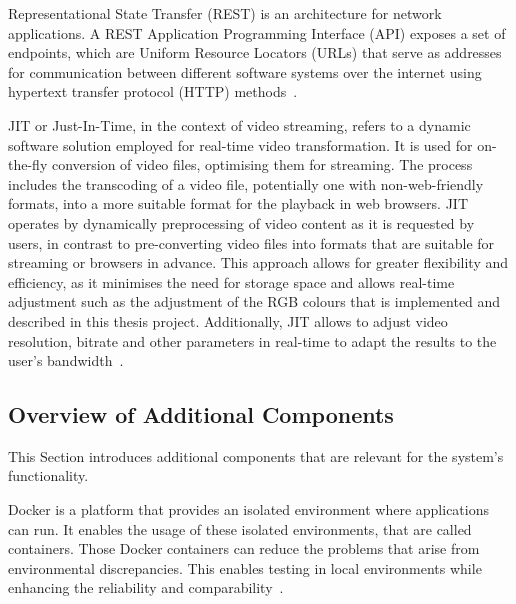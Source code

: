 \documentclass[../MasterThesis.tex]{subfiles}
\begin{document}


Representational State Transfer (REST) is an architecture for network applications. A REST Application Programming Interface (API) exposes a set of endpoints, which are Uniform Resource Locators (URLs) that serve as addresses for communication between different software systems over the internet using hypertext transfer protocol (HTTP) methods~\cite{IEEE_Rest, webservice, Nodejs_Rest}.



	
JIT or Just-In-Time, in the context of video streaming, refers to a dynamic software solution employed for real-time video transformation. 
It is used for on-the-fly conversion of video files, optimising them for streaming. The process includes the transcoding of a video file, potentially one with non-web-friendly formats, into a more suitable format for the playback in web browsers.
JIT operates by dynamically preprocessing of video content as it is requested by users, in contrast to pre-converting video files into formats that are suitable for streaming or browsers in advance. 
This approach allows for greater flexibility and efficiency, as it minimises the need for storage space and allows real-time adjustment such as the adjustment of the RGB colours that is implemented and described in this thesis project.
Additionally, JIT allows to adjust video resolution, bitrate and other parameters in real-time to adapt the results to the user's bandwidth~\cite{JIT_IEEE}.







\subsection{Overview of Additional Components}
\label{subsection:overview_additional_components}


This Section introduces additional components that are relevant for the system's functionality.


Docker is a platform that provides an isolated environment where applications can run. It enables the usage of these isolated environments, that are called containers.
Those Docker containers can reduce the problems that arise from environmental discrepancies. This enables testing in local environments while enhancing the reliability and comparability~\cite{docker}.
\end{document}
